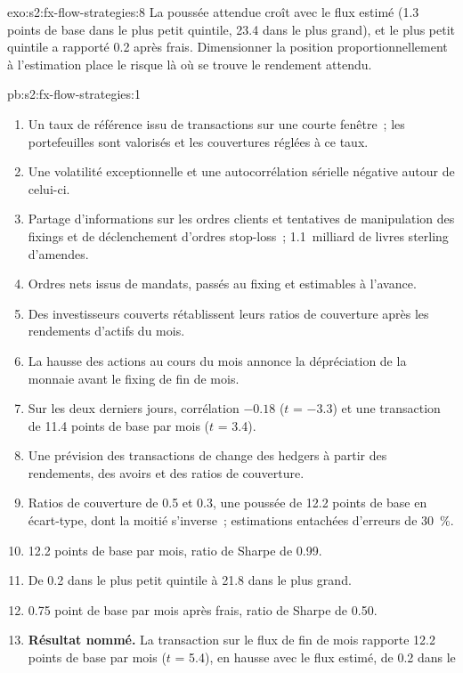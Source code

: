 \begin{solution}{exo:s2:fx-flow-strategies:8}
La poussée attendue croît avec le flux estimé (1.3 points de base dans le plus petit quintile, 23.4 dans le plus grand), et le plus petit quintile a rapporté 0.2 après
frais. Dimensionner la position proportionnellement à l'estimation place le risque là où se trouve le rendement attendu.
\end{solution}

\begin{solution}{pb:s2:fx-flow-strategies:1}
\begin{enumerate}
\item Un taux de référence issu de transactions sur une courte fenêtre~; les portefeuilles sont valorisés et les couvertures réglées à ce taux.
\item Une volatilité exceptionnelle et une autocorrélation sérielle négative autour de celui-ci.
\item Partage d'informations sur les ordres clients et tentatives de manipulation des fixings et de déclenchement d'ordres stop-loss~; 1.1~milliard de livres sterling d'amendes.
\item Ordres nets issus de mandats, passés au fixing et estimables à l'avance.
\item Des investisseurs couverts rétablissent leurs ratios de couverture après les rendements d'actifs du mois.
\item La hausse des actions au cours du mois annonce la dépréciation de la monnaie avant le fixing de fin de mois.
\item Sur les deux derniers jours, corrélation $-0.18$ ($t$ = $-3.3$) et une transaction de 11.4 points de base par mois ($t$ = 3.4).
\item Une prévision des transactions de change des hedgers à partir des rendements, des avoirs et des ratios de couverture.
\item Ratios de couverture de 0.5 et 0.3, une poussée de 12.2 points de base en écart-type, dont la moitié s'inverse~; estimations entachées d'erreurs de 30~\%.
\item 12.2 points de base par mois, ratio de Sharpe de 0.99.
\item De 0.2 dans le plus petit quintile à 21.8 dans le plus grand.
\item 0.75 point de base par mois après frais, ratio de Sharpe de 0.50.
\item \textbf{Résultat nommé.} La transaction sur le flux de fin de mois rapporte 12.2 points de base par mois ($t$ = 5.4), en hausse avec le flux estimé, de 0.2 dans le

\end{enumerate}
\end{solution}
